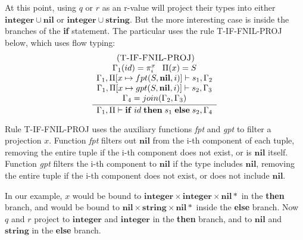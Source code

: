 \documentclass{sigplanconf}
\newcommand{\Nil}{\mathbf{nil}}
\newcommand{\Integer}{\mathbf{integer}}
\newcommand{\String}{\mathbf{string}}
\newcommand{\mylabel}[1]{\; (\textsc{#1})}
\newcommand{\env}{\Gamma}
\newcommand{\penv}{\Pi}
\begin{document}
At this point, using $q$ or $r$ as an r-value will project
their types into either $\Integer \cup \Nil$ or $\Integer \cup \String$. But the more interesting case is inside the
branches of the {\bf if} statement. The particular uses the rule {\sc T-IF-FNIL-PROJ} below, which uses flow typing:
\[
\begin{array}{c}
\mylabel{T-IF-FNIL-PROJ}\\
\dfrac{\begin{array}{c}
       \env_{1}(id) = \pi_{i}^{x} \;\;\; \penv(x) = S\\
       \env_{1}, \penv[x \mapsto fpt(S,\Nil,i)] \vdash s_{1}, \env_{2} \\
       \env_{1}, \penv[x \mapsto gpt(S,\Nil,i)] \vdash s_{2}, \env_{3} \\
       \env_{4} = join(\env_{2}, \env_{3}) 
      \end{array}}
      {\env_{1}, \penv \vdash \mathbf{if} \; id \; \mathbf{then} \; s_{1} \; \mathbf{else} \; s_{2}, \env_{4}}
\end{array}
\]

Rule \textsc{T-IF-FNIL-PROJ} uses the auxiliary functions \emph{fpt} and \emph{gpt}
to filter a projection $x$. Function {\em fpt} filters out $\Nil$ from the i-th
component of each tuple, removing the entire tuple if the i-th
component does not exist, or is $\Nil$ itself. Function {\em gpt}
filters the i-th component to $\Nil$ if the type includes
$\Nil$, removing the entire tuple if the i-th component does
not exist, or does not include $\Nil$.

In our example, $x$ would be bound to $\Integer \times \Integer \times \Nil{*}$ in the {\bf then} branch, and would be bound
to $\Nil \times \String \times \Nil{*}$ inside the {\bf else}
branch. Now $q$ and $r$ project to $\Integer$ and $\Integer$
in the {\bf then} branch, and to $\Nil$ and $\String$ in the
{\bf else} branch. 
\end{document}
